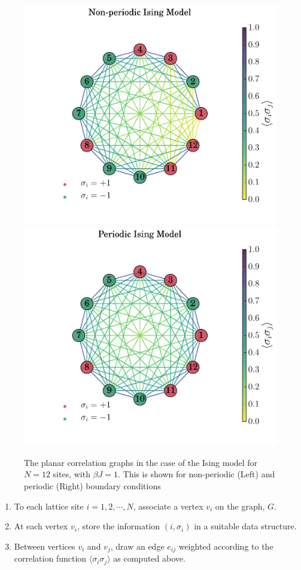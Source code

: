 \documentclass[11pt]{article}
\numberwithin{equation}{section}
\numberwithin{figure}{section}
\numberwithin{table}{section}
\numberwithin{definition}{section}
\begin{document}
\begin{figure}[h]
\begin{center}
\includegraphics[width=0.49\linewidth]{figures/non_periodic.pdf} \hfill
\includegraphics[width=0.49\linewidth]{figures/periodic.pdf}
\caption{The planar correlation graphs in the case of the Ising model for $N = 12$ sites, with $\beta J = 1$. This is shown for non-periodic (Left) and periodic (Right) boundary conditions}\label{fig:isinggraphs}
\end{center}
\end{figure}
\begin{enumerate}
        \item To each lattice site $i = 1, 2, \cdots, N$, associate a vertex $v_i$ on the graph, $G$.
        \item At each vertex $v_i$, store the information $(i, \sigma_i)$ in a suitable data structure.
        \item Between vertices $v_i$ and $v_j$, draw an edge $e_{ij}$ weighted according to the correlation function $\langle \sigma_i \sigma_j \rangle$ as computed above.
\end{enumerate}
\end{document}
